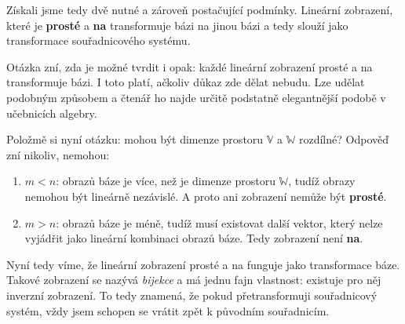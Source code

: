 \documentclass[a5paper,12pt]{amsbook}
\theoremstyle{definition}
\newcommand{\myspace}[1]{\mathbb{#1}}
\begin{document}
Získali jsme tedy dvě nutné a zároveň postačující podmínky. Lineární zobrazení, které 
je \textbf{prosté} a \textbf{na} transformuje bázi na jinou bázi a tedy slouží jako transformace
souřadnicového systému.

Otázka zní, zda je možné tvrdit i opak: každé lineární zobrazení prosté a na transformuje bázi.
I toto platí, ačkoliv důkaz zde dělat nebudu. Lze udělat podobným způsobem a čtenář ho najde
určitě podstatně elegantnější podobě v učebnicích algebry.

Položmě si nyní otázku: mohou být dimenze prostoru $\myspace{V}$ a $\myspace{W}$ rozdílné?
Odpověď zní nikoliv, nemohou:
\begin{enumerate}
  \item $m < n$: obrazů báze je více, než je dimenze prostoru $\myspace{W}$, tudíž obrazy
      nemohou být lineárně nezávislé. A proto ani zobrazení nemůže být \textbf{prosté}.
  \item $m > n$: obrazů báze je méně, tudíž musí existovat další vektor, který nelze vyjádřit
      jako lineární kombinaci obrazů báze. Tedy zobrazení není \textbf{na}.
\end{enumerate}

Nyní tedy víme, že lineární zobrazení prosté a na funguje jako transformace báze. Takové
zobrazení se nazývá \textit{bijekce} a má jednu fajn vlastnost: existuje pro něj inverzní
zobrazení. To tedy znamená, že pokud přetransformuji souřadnicový systém, vždy jsem schopen
se vrátit zpět k původním souřadnicím.
\end{document}
